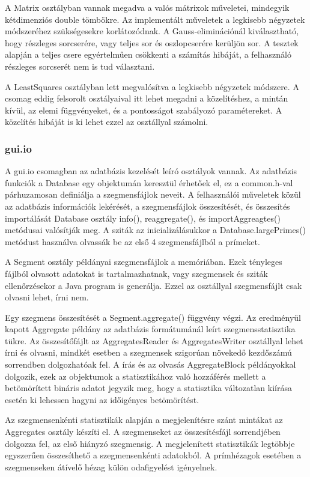 A Matrix osztályban vannak megadva a valós mátrixok műveletei, mindegyik kétdimenziós double tömbökre.
Az implementált műveletek a legkisebb négyzetek módszeréhez szükségesekre korlátozódnak.
A Gauss-eliminációnál kiválasztható, hogy részleges sorcserére, vagy teljes sor és oszlopcserére kerüljön sor.
{\color{red}A tesztek alapján a teljes csere egyértelműen csökkenti a számítás hibáját, a felhasználó részleges sorcserét nem is tud választani.}

A LeastSquares osztályban lett megvalósítva a legkisebb négyzetek módszere. A csomag eddig felsorolt osztályaival itt lehet megadni a közelítéshez, a mintán kívül, az elemi függvényeket, és a pontosságot szabályozó paramétereket.
A közelítés hibáját is ki lehet ezzel az osztállyal számolni.

\subsubsection{gui.io}

A gui.io csomagban az adatbázis kezelését leíró osztályok vannak.
Az adatbázis funkciók a Database egy objektumán keresztül érhetőek el, ez a common.h-val párhuzamosan definiálja a szegmensfájlok neveit.
A felhasználói műveletek közül az adatbázis információk lekérését, a szegmensfájlok összesítését, és összesítés importálását Database osztály info(), reaggregate(), és importAggreagtes() metódusai
valósítják meg.
A sziták az inicializálásukkor a Database.largePrimes() metódust használva olvassák be az első 4 szegmensfájlból a prímeket.

A Segment osztály példányai szegmensfájlok a memóriában.
Ezek tényleges fájlból olvasott adatokat is tartalmazhatnak, vagy szegmensek és sziták ellenőrzésekor a Java program is generálja.
Ezzel az osztállyal szegmensfájlt csak olvasni lehet, írni nem.

Egy szegmens összesítését a Segment.aggregate() függvény végzi.
Az eredményül kapott Aggregate példány az adatbázis formátumánál leírt szegmensstatisztika tükre.
Az összesítőfájlt az AggregatesReader és AggregatesWriter osztállyal lehet írni és olvasni, mindkét esetben a szegmensek szigorúan növekedő kezdőszámú sorrendben dolgozhatóak fel.
A írás és az olvasás AggregateBlock példányokkal dolgozik, ezek az objektumok a statisztikához való hozzáférés mellett a betömörített bináris adatot jegyzik meg, hogy a statisztika változatlan kiírása esetén ki lehessen hagyni az időigényes betömörítést.

Az szegmensenkénti statisztikák alapján a megjelenítésre szánt mintákat az Aggregates osztály készíti el.
A szegmenseket az összesítésfájl sorrendjében dolgozza fel, az első hiányzó szegmensig. A megjelenített statisztikák legtöbbje egyszerűen összesíthető a szegmensenkénti adatokból. A prímhézagok esetében a szegmenseken átívelő hézag külön odafigyelést igényelnek.

